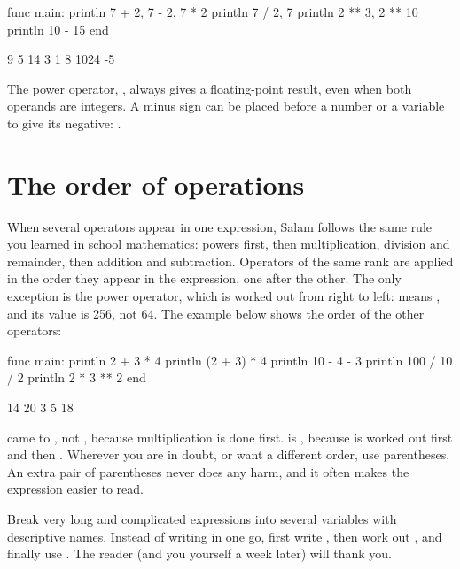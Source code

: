 \begin{salamcode}
func main:
    println 7 + 2, 7 - 2, 7 * 2
    println 7 / 2, 7 %
    println 2 ** 3, 2 ** 10
    println 10 - 15
end
\end{salamcode}

\begin{salamout}
9 5 14
3 1
8 1024
-5
\end{salamout}

The power operator, \code{**}, always gives a floating-point result, even
when both operands are integers. A minus sign can be placed before a number
or a variable to give its negative: .

\section{The order of operations}

When several operators appear in one expression, Salam follows the same rule
you learned in school mathematics: powers first, then multiplication,
division and remainder, then addition and subtraction. Operators of the same
rank are applied in the order they appear in the expression, one after the
other. The only exception is the power operator, which is worked out from
right to left:  means , and its value
is 256, not 64. The example below shows the order of the other operators:

\begin{salamcode}
func main:
    println 2 + 3 * 4
    println (2 + 3) * 4
    println 10 - 4 - 3
    println 100 / 10 / 2
    println 2 * 3 ** 2
end
\end{salamcode}

\begin{salamout}
14
20
3
5
18
\end{salamout}

 came to , not , because multiplication is
done first.  is , because  is worked
out first and then . Wherever you are in doubt, or want a
different order, use parentheses. An extra pair of parentheses never does
any harm, and it often makes the expression easier to read.

\begin{tip}
Break very long and complicated expressions into several variables with
descriptive names. Instead of writing 
in one go, first write , then work out
, and finally use .
The reader (and you yourself a week later) will thank you.
\end{tip}

